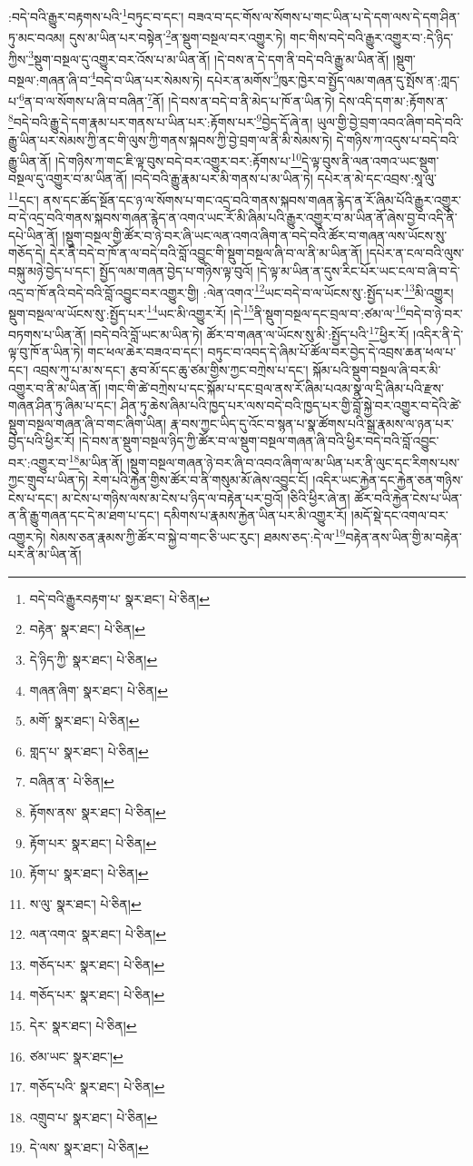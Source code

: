 :བདེ་བའི་རྒྱུར་བརྟགས་པའི་\footnote{བདེ་བའི་རྒྱུརབརྟག་པ་  སྣར་ཐང་།  པེ་ཅིན། }བཏུང་བ་དང་། བཟའ་བ་དང་གོས་ལ་སོགས་པ་གང་ཡིན་པ་དེ་དག་ལས་དེ་དག་ཤིན་ཏུ་མང་བའམ། དུས་མ་ཡིན་པར་བསྟེན་\footnote{བརྟེན་  སྣར་ཐང་།  པེ་ཅིན། }ན་སྡུག་བསྔལ་བར་འགྱུར་ཏེ། གང་གིས་བདེ་བའི་རྒྱུར་འགྱུར་བ་:དེ་ཉིད་ཀྱིས་\footnote{དེ་ཉིད་ཀྱི་  སྣར་ཐང་།  པེ་ཅིན། }སྡུག་བསྔལ་དུ་འགྱུར་བར་འོས་པ་མ་ཡིན་ནོ། །དེ་བས་ན་དེ་དག་ནི་བདེ་བའི་རྒྱུ་མ་ཡིན་ནོ། །སྡུག་བསྔལ་:གཞན་ཞི་བ་\footnote{གཞན་ཞིག་  སྣར་ཐང་།  པེ་ཅིན། }བདེ་བ་ཡིན་པར་སེམས་ཏེ། དཔེར་ན་མགོས་\footnote{མགོ་  སྣར་ཐང་།  པེ་ཅིན། }ཁུར་ཁྱེར་བ་སྤྱོད་ལམ་གཞན་དུ་སྤོས་ན་:ཀླད་པ་\footnote{གླད་པ་  སྣར་ཐང་།  པེ་ཅིན། }ན་བ་ལ་སོགས་པ་ཞི་བ་བཞིན་\footnote{བཞིན་ན་  པེ་ཅིན། }ནོ། །དེ་བས་ན་བདེ་བ་ནི་མེད་པ་ཁོ་ན་ཡིན་ཏེ། དེས་འདི་དག་མ་:རྟོགས་ན་\footnote{རྟོགས་ནས་  སྣར་ཐང་།  པེ་ཅིན། }བདེ་བའི་རྒྱུ་དེ་དག་རྣམ་པར་གནས་པ་ཡིན་པར་:རྟོགས་པར་\footnote{རྟོག་པར་  སྣར་ཐང་།  པེ་ཅིན། }བྱེད་དོ་ཞེ་ན། ཡུལ་གྱི་བྱེ་བྲག་འབའ་ཞིག་བདེ་བའི་རྒྱུ་ཡིན་པར་སེམས་ཀྱི་ནང་གི་ལུས་ཀྱི་གནས་སྐབས་ཀྱི་བྱེ་བྲག་ལ་ནི་མི་སེམས་ཏེ། དེ་གཉིས་ཀ་འདུས་པ་བདེ་བའི་རྒྱུ་ཡིན་ནོ། །དེ་གཉིས་ཀ་གང་ཇི་ལྟ་བུས་བདེ་བར་འགྱུར་བར་:རྟོགས་པ་\footnote{རྟོག་པ་  སྣར་ཐང་།  པེ་ཅིན། }དེ་ལྟ་བུས་ནི་ལན་འགའ་ཡང་སྡུག་བསྔལ་དུ་འགྱུར་བ་མ་ཡིན་ནོ། །བདེ་བའི་རྒྱུ་རྣམ་པར་མི་གནས་པ་མ་ཡིན་ཏེ། དཔེར་ན་མེ་དང་འབྲས་:སཱ་ལུ་\footnote{ས་ལུ་  སྣར་ཐང་།  པེ་ཅིན། }དང་། ནས་དང་ཚོད་སྔོན་དང་ཉ་ལ་སོགས་པ་གང་འདྲ་བའི་གནས་སྐབས་གཞན་རྙེད་ན་རོ་ཞིམ་པོའི་རྒྱུར་འགྱུར་བ་དེ་འདྲ་བའི་གནས་སྐབས་གཞན་རྙེད་ན་འགའ་ཡང་རོ་མི་ཞིམ་པའི་རྒྱུར་འགྱུར་བ་མ་ཡིན་ནོ་ཞེས་བྱ་བ་འདི་ནི་དཔེ་ཡིན་ནོ། །སྡུག་བསྔལ་གྱི་ཚོར་བ་ཉེ་བར་ཞི་ཡང་ལན་འགའ་ཞིག་ན་བདེ་བའི་ཚོར་བ་གཞན་ལས་ཡོངས་སུ་གཅོད་དེ། དེར་ནི་བདེ་བ་ཁོ་ན་ལ་བདེ་བའི་བློ་འབྱུང་གི་སྡུག་བསྔལ་ཞི་བ་ལ་ནི་མ་ཡིན་ནོ། །དཔེར་ན་ངལ་བའི་ལུས་བསྐུ་མཉེ་བྱེད་པ་དང་། སྤྱོད་ལམ་གཞན་བྱེད་པ་གཉིས་ལྟ་བུའོ། །དེ་ལྟ་མ་ཡིན་ན་དུས་རིང་པོར་ཡང་ངལ་བ་ཞི་བ་དེ་འདྲ་བ་ཁོ་ནའི་བདེ་བའི་བློ་འབྱུང་བར་འགྱུར་གྱི། :ལེན་འགའ་\footnote{ལན་འགའ་  སྣར་ཐང་།  པེ་ཅིན། }ཡང་བདེ་བ་ལ་ཡོངས་སུ་:སྤྱོད་པར་\footnote{གཅོད་པར་  སྣར་ཐང་།  པེ་ཅིན། }མི་འགྱུར། སྡུག་བསྔལ་ལ་ཡོངས་སུ་:སྤྱོད་པར་\footnote{གཅོད་པར་  སྣར་ཐང་།  པེ་ཅིན། }ཡང་མི་འགྱུར་རོ། །དེ་\footnote{དེར་  སྣར་ཐང་།  པེ་ཅིན། }ནི་སྡུག་བསྔལ་དང་བྲལ་བ་:ཙམ་ལ་\footnote{ཙམ་ཡང་  སྣར་ཐང་། }བདེ་བ་ཉེ་བར་བཏགས་པ་ཡིན་ནོ། །བདེ་བའི་བློ་ཡང་མ་ཡིན་ཏེ། ཚོར་བ་གཞན་ལ་ཡོངས་སུ་མི་:སྤྱོད་པའི་\footnote{གཅོད་པའི་  སྣར་ཐང་།  པེ་ཅིན། }ཕྱིར་རོ། །འདིར་ནི་དེ་ལྟ་བུ་ཁོ་ན་ཡིན་ཏེ། གང་ཕལ་ཆེར་བཟའ་བ་དང་། བཏུང་བ་འབད་དེ་ཞིམ་པོ་ཚོལ་བར་བྱེད་དེ་འབྲས་ཆན་ཕལ་པ་དང་། འབྲས་ཀུ་པ་མ་ས་དང་། རྩབ་མོ་དང་ཆུ་ཙམ་གྱིས་ཀྱང་བཀྲེས་པ་དང་། སྐོམ་པའི་སྡུག་བསྔལ་ཞི་བར་མི་འགྱུར་བ་ནི་མ་ཡིན་ནོ། །གང་གི་ཚེ་བཀྲེས་པ་དང་སྐོམ་པ་དང་བྲལ་ནས་རོ་ཞིམ་པའམ་སྣ་ལ་དྲི་ཞིམ་པའི་རྫས་གཞན་ཤིན་ཏུ་ཞིམ་པ་དང་། ཤིན་ཏུ་ཆེས་ཞིམ་པའི་ཁྱད་པར་ལས་བདེ་བའི་ཁྱད་པར་གྱི་བློ་སྐྱེ་བར་འགྱུར་བ་དེའི་ཚེ་སྡུག་བསྔལ་གཞན་ཞི་བ་གང་ཞིག་ཡིན། རྣ་བས་ཀྱང་ཡིད་དུ་འོང་བ་སྙན་པ་སྣ་ཚོགས་པའི་སྒྲ་རྣམས་ལ་ཉན་པར་བྱེད་པའི་ཕྱིར་རོ། །དེ་བས་ན་སྡུག་བསྔལ་ཉིད་ཀྱི་ཚོར་བ་ལ་སྡུག་བསྔལ་གཞན་ཞི་བའི་ཕྱིར་བདེ་བའི་བློ་འབྱུང་བར་:འགྱུར་བ་\footnote{འགྲུབ་པ་  སྣར་ཐང་།  པེ་ཅིན། }མ་ཡིན་ནོ། །སྡུག་བསྔལ་གཞན་ཉེ་བར་ཞི་བ་འབའ་ཞིག་ལ་མ་ཡིན་པར་ནི་ལུང་དང་རིགས་པས་ཀྱང་གྲུབ་པ་ཡིན་ཏེ། རེག་པའི་རྐྱེན་གྱིས་ཚོར་བ་ནི་གསུམ་མོ་ཞེས་འབྱུང་ངོ། །འདིར་ཡང་རྐྱེན་དང་རྐྱེན་ཅན་གཉིས་ངེས་པ་དང་། མ་ངེས་པ་གཉིས་ལས་མ་ངེས་པ་ཉིད་ལ་བརྟེན་པར་བྱའོ། །ཅིའི་ཕྱིར་ཞེ་ན། ཚོར་བའི་རྐྱེན་ངེས་པ་ཡིན་ན་ནི་རྒྱུ་གཞན་དང་དེ་མ་ཐག་པ་དང་། དམིགས་པ་རྣམས་རྐྱེན་ཡིན་པར་མི་འགྱུར་རོ། །མདོ་སྡེ་དང་འགལ་བར་འགྱུར་ཏེ། སེམས་ཅན་རྣམས་ཀྱི་ཚོར་བ་སྐྱེ་བ་གང་ཅི་ཡང་རུང་། ཐམས་ཅད་:དེ་ལ་\footnote{དེ་ལས་  སྣར་ཐང་།  པེ་ཅིན། }བརྟེན་ནས་ཡིན་གྱི་མ་བརྟེན་པར་ནི་མ་ཡིན་ནོ། 